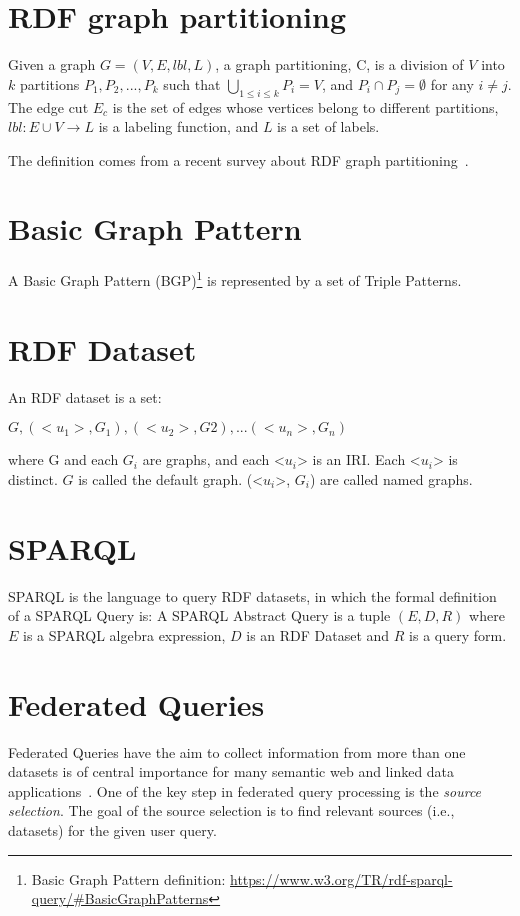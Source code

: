 \section{RDF graph partitioning}
Given a graph $G=(V,E, lbl, L)$, a graph partitioning, C, is a division of $V$ into $k$ partitions ${P_1,P_2,...,P_k}$ such that $\bigcup\limits_{1 \leq i \leq k}P_i=V$, and $P_i \cap P_j = \emptyset$ for any $i \neq j$. The edge cut $E_c$ is the set of edges whose vertices belong to different partitions, $lbl : E \cup V \rightarrow L$ is a labeling function, and $L$ is a set of labels. 

The definition comes from a recent survey about RDF graph partitioning~\cite{tomaszuk2015rdf}.

\section{Basic Graph Pattern}
A Basic Graph Pattern (BGP)\footnote{Basic Graph Pattern definition:  \url{https://www.w3.org/TR/rdf-sparql-query/\#BasicGraphPatterns}} is represented by a set of Triple Patterns\cite{fletcher2008algebra}.

\section{RDF Dataset}
An RDF dataset is a set:

${ G, (<u_1>, G_1), (<u_2>, G2), . . . (<u_n>, G_n) }$

where G and each $G_i$ are graphs, and each <$u_i$> is an IRI. Each <$u_i$> is distinct. $G$ is called the default graph. (<$u_i$>, $G_i$) are called named graphs.

\section{SPARQL} 
\ac{SPARQL} is the language to query RDF datasets, in which the formal definition of a SPARQL Query is:
A SPARQL Abstract Query is a tuple $(E, D, R)$ where $E$ is a SPARQL algebra expression, $D$ is an RDF Dataset and $R$ is a query form.

\section{Federated Queries} 
Federated Queries have the aim to collect information from more than one datasets is of central importance for many semantic web and linked data applications~\cite{saleem2013fostering,bigtcga2014}. One of the key step in federated query processing is the \emph{source selection}. The goal of the source selection is to find relevant sources (i.e., datasets) for the given user query.